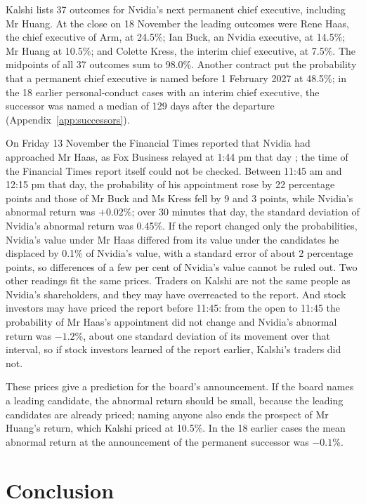 \documentclass[11pt,a4paper]{article}
\begin{document}
Kalshi lists 37 outcomes for Nvidia's next permanent chief executive, including Mr Huang. At the close on 18 November the leading outcomes were Rene Haas, the chief executive of Arm, at 24.5\%; Ian Buck, an Nvidia executive, at 14.5\%; Mr Huang at 10.5\%; and Colette Kress, the interim chief executive, at 7.5\%. The midpoints of all 37 outcomes sum to 98.0\%. Another contract put the probability that a permanent chief executive is named before 1 February 2027 at 48.5\%; in the 18 earlier personal-conduct cases with an interim chief executive, the successor was named a median of 129 days after the departure (Appendix~\ref{app:successors}).

On Friday 13 November the Financial Times reported that Nvidia had approached Mr Haas, as Fox Business relayed at 1:44 pm that day \citep{fox2026haas}; the time of the Financial Times report itself could not be checked. Between 11:45 am and 12:15 pm that day, the probability of his appointment rose by 22 percentage points and those of Mr Buck and Ms Kress fell by 9 and 3 points, while Nvidia's abnormal return was $+0.02$\%; over 30 minutes that day, the standard deviation of Nvidia's abnormal return was 0.45\%. If the report changed only the probabilities, Nvidia's value under Mr Haas differed from its value under the candidates he displaced by 0.1\% of Nvidia's value, with a standard error of about 2 percentage points, so differences of a few per cent of Nvidia's value cannot be ruled out. Two other readings fit the same prices. Traders on Kalshi are not the same people as Nvidia's shareholders, and they may have overreacted to the report. And stock investors may have priced the report before 11:45: from the open to 11:45 the probability of Mr Haas's appointment did not change and Nvidia's abnormal return was $-1.2$\%, about one standard deviation of its movement over that interval, so if stock investors learned of the report earlier, Kalshi's traders did not.

These prices give a prediction for the board's announcement. If the board names a leading candidate, the abnormal return should be small, because the leading candidates are already priced; naming anyone also ends the prospect of Mr Huang's return, which Kalshi priced at 10.5\%. In the 18 earlier cases the mean abnormal return at the announcement of the permanent successor was $-0.1$\%.

\section{Conclusion}
\end{document}
